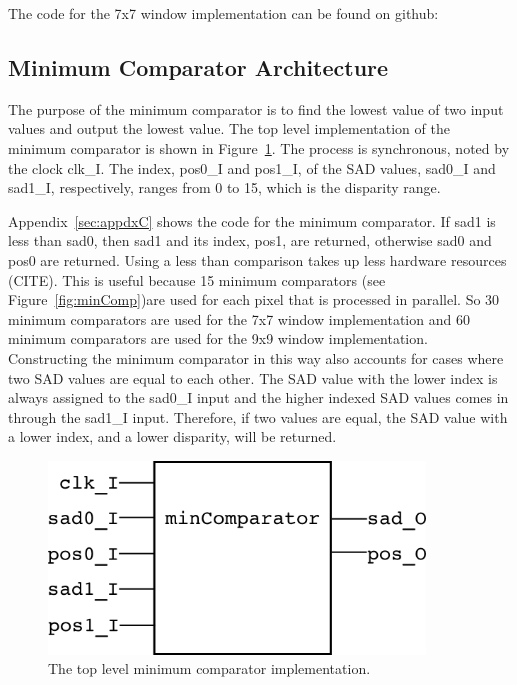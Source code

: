 The code for the 7x7 window implementation can be found on github:
\\

\subsection{Minimum Comparator Architecture}

The purpose of the minimum comparator is to find the lowest value of two input values and output the lowest value. The top level implementation of the minimum comparator is shown in Figure~\ref{fig:minComp_rtl}. The process is synchronous, noted by the clock clk\_I. The index, pos0\_I and pos1\_I, of the SAD values, sad0\_I and sad1\_I, respectively, ranges from 0 to 15, which is the disparity range. 

Appendix~\ref{sec:appdxC} shows the code for the minimum comparator. If sad1 is less than sad0, then sad1 and its index, pos1, are returned, otherwise sad0 and pos0 are returned. Using a less than comparison takes up less hardware resources (CITE). This is useful because 15 minimum comparators (see Figure~\ref{fig:minComp})are used for each pixel that is processed in parallel. So 30 minimum comparators are used for the 7x7 window implementation and 60 minimum comparators are used for the 9x9 window implementation. Constructing the minimum comparator in this way also accounts for cases where two SAD values are equal to each other. The SAD value with the lower index is always assigned to the sad0\_I input and the higher indexed SAD values comes in through the sad1\_I input. Therefore, if two values are equal, the SAD value with a lower index, and a lower disparity, will be returned.

\begin{figure}[h]
	\begin{center}
		\includegraphics[width=100mm]{figures/minComparator_rtl.png}
		\captionfonts
		\caption{The top level minimum comparator implementation.}
		\label{fig:minComp_rtl}
	\end{center}
\end{figure}


